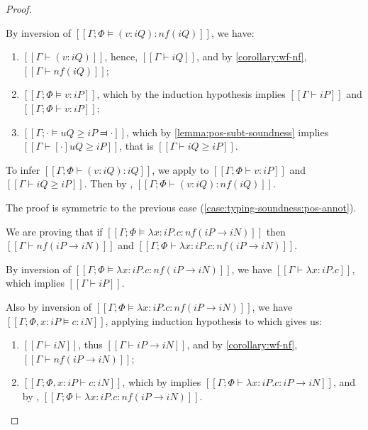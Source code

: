 \begin{proof}
\begin{caseof}
            By inversion of $[[Γ; Φ ⊨ (v : iQ) : nf(iQ)]]$,
            we have:
            \begin{enumerate}
                \item $[[Γ ⊢ (v : iQ)]]$, hence, $[[Γ ⊢ iQ]]$, 
                    and by \cref{corollary:wf-nf}, $[[Γ ⊢ nf(iQ)]]$;
                \item $[[Γ; Φ ⊨ v : iP]]$, 
                    which by the induction hypothesis implies
                    $[[Γ ⊢ iP]]$ and $[[Γ; Φ ⊢ v : iP]]$;
                \item $[[Γ ; · ⊨ uQ ≥ iP ⫤ ·]]$,
                    which by \cref{lemma:pos-subt-soundness} implies
                    $[[Γ ⊢ [·]uQ ≥ iP]]$, that is $[[Γ ⊢ iQ ≥ iP]]$.
            \end{enumerate}

            To infer 
            $[[Γ; Φ ⊢ (v : iQ) : iQ]]$, 
            we apply  
            to $[[Γ; Φ ⊢ v : iP]]$ and $[[Γ ⊢ iQ ≥ iP]]$.
            Then by ,
            $[[Γ; Φ ⊢ (v : iQ) : nf(iQ)]]$.
  
        \item {}
            The proof is symmetric to the previous case
            (\cref{case:typing-soundness:pos-annot}).

        \item {}
            We are proving that if 
            $[[Γ; Φ ⊨ λx:iP . c : nf(iP → iN)]]$
            then 
            $[[Γ ⊢ nf(iP → iN)]]$ and
            $[[Γ; Φ ⊢ λx:iP . c : nf(iP → iN)]]$.


            By inversion of $[[Γ; Φ ⊨ λx:iP . c : nf(iP → iN)]]$,
            we have $[[Γ ⊢ λx:iP . c]]$, 
            which implies $[[Γ ⊢ iP]]$.

            Also by inversion of $[[Γ; Φ ⊨ λx:iP . c : nf(iP → iN)]]$,
            we have $[[Γ; Φ, x:iP ⊨ c : iN]]$, applying induction 
            hypothesis to which gives us:
            \begin{enumerate}
                \item  $[[Γ ⊢ iN]]$, thus $[[Γ ⊢ iP → iN]]$, 
                    and by \cref{corollary:wf-nf}, $[[Γ ⊢ nf(iP → iN)]]$;
                \item $[[Γ; Φ, x:iP ⊢ c : iN]]$, 
                    which by  implies
                    $[[Γ; Φ ⊢ λx:iP . c : iP → iN]]$, 
                    and by ,
                    $[[Γ; Φ ⊢ λx:iP . c : nf(iP → iN)]]$.
            \end{enumerate}


\end{caseof}
\end{proof}
